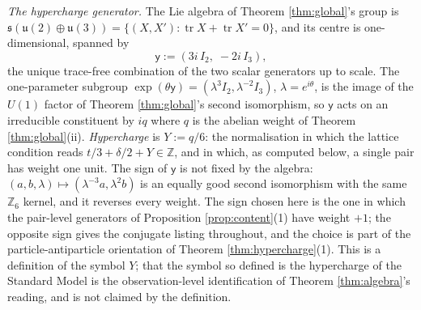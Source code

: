 \documentclass[11pt]{article}
\theoremstyle{definition}
\newcommand{\tr}{\operatorname{tr}}
\newcommand{\uu}{\mathfrak{u}}
\begin{document}
\emph{The hypercharge generator.} The Lie algebra of Theorem \ref{thm:global}'s group is $\mathfrak{s}(\uu(2) \oplus \uu(3)) = \{(X, X') : \tr X + \tr X' = 0\}$, and its centre is one-dimensional, spanned by
\[
\mathsf{y} := (3i\,I_{2},\; -2i\,I_{3}),
\]
the unique trace-free combination of the two scalar generators up to scale. The one-parameter subgroup $\exp(\theta\mathsf{y}) = (\lambda^{3}I_{2}, \lambda^{-2}I_{3})$, $\lambda = e^{i\theta}$, is the image of the $U(1)$ factor of Theorem \ref{thm:global}'s second isomorphism, so $\mathsf{y}$ acts on an irreducible constituent by $iq$ where $q$ is the abelian weight of Theorem \ref{thm:global}(ii). \emph{Hypercharge} is $Y := q/6$: the normalisation in which the lattice condition reads $t/3 + \delta/2 + Y \in \mathbb{Z}$, and in which, as computed below, a single pair has weight one unit. The sign of $\mathsf{y}$ is not fixed by the algebra: $(a, b, \lambda) \mapsto (\lambda^{-3}a, \lambda^{2}b)$ is an equally good second isomorphism with the same $\mathbb{Z}_{6}$ kernel, and it reverses every weight. The sign chosen here is the one in which the pair-level generators of Proposition \ref{prop:content}(1) have weight $+1$; the opposite sign gives the conjugate listing throughout, and the choice is part of the particle-antiparticle orientation of Theorem \ref{thm:hypercharge}(1). This is a definition of the symbol $Y$; that the symbol so defined is the hypercharge of the Standard Model is the observation-level identification of Theorem \ref{thm:algebra}'s reading, and is not claimed by the definition.
\end{document}
